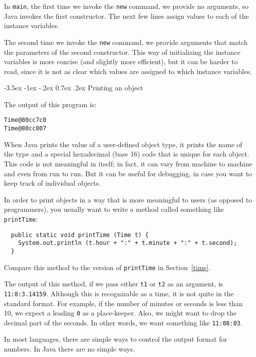 \documentclass{book}
\makeatletter
\renewcommand{\section}{\@startsection 
    {section} {1} {0mm}%
    {-3.5ex \@plus -1ex \@minus -.2ex}%
    {0.7ex \@plus.2ex}%
    {\normalfont\Large\bfseries}}
\makeatother
\begin{document}
In {\tt main}, the first time we invoke the {\tt new} command,
we provide no arguments, so Java invokes the first constructor.
The next few lines assign values to each of the instance
variables.

The second time we invoke the {\tt new} command, we provide
arguments that match the parameters of the second constructor.
This way of initializing the instance variables is more concise
(and slightly more efficient), but it can be harder to read, since
it is not as clear which values are assigned to which instance
variables.

\section{Printing an object}
\label{printobject}

The output of this program is:

\begin{verbatim}
Time@80cc7c0
Time@80cc807
\end{verbatim}
%
When Java prints the value of a user-defined object type, it prints
the name of the type and a special hexadecimal (base 16) code that is
unique for each object.  This code is not meaningful in itself; in
fact, it can vary from machine to machine and even from run to run.
But it can be useful for debugging, in case you want to keep track of
individual objects.

In order to print objects in a way that is more meaningful to users
(as opposed to programmers), you usually want to write a method
called something like {\tt printTime}:

\begin{verbatim}
  public static void printTime (Time t) {
    System.out.println (t.hour + ":" + t.minute + ":" + t.second);
  }
\end{verbatim}
%
Compare this method to the version of {\tt printTime} in
Section~\ref{time}.

The output of this method, if we pass either {\tt t1} or {\tt t2} as
an argument, is {\tt 11:8:3.14159}.  Although this is recognizable
as a time, it is not quite in the standard format.  For example, if
the number of minutes or seconds is less than 10, we expect a leading
{\tt 0} as a place-keeper.  Also, we might want to drop the decimal
part of the seconds.  In other words, we want something like
{\tt 11:08:03}.

In most languages, there are simple ways to control the output format
for numbers.  In Java there are no simple ways.
\end{document}
